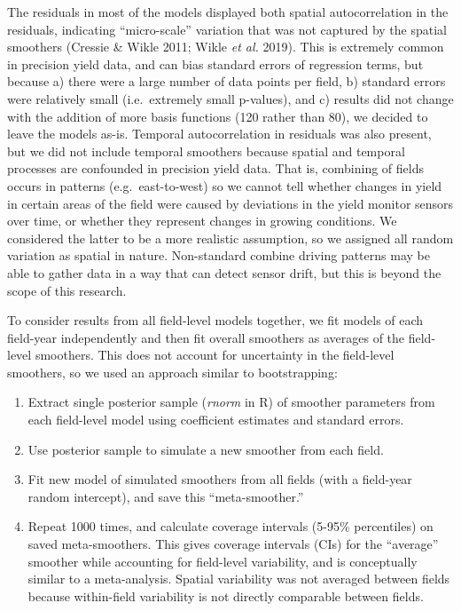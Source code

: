 \documentclass[]{elsarticle} %
\providecommand{\tightlist}{%
  \setlength{\itemsep}{0pt}\setlength{\parskip}{0pt}}
\begin{document}
The residuals in most of the models displayed both spatial autocorrelation in the residuals, indicating ``micro-scale'' variation that was not captured by the spatial smoothers (Cressie \& Wikle 2011; Wikle \emph{et al.} 2019).
This is extremely common in precision yield data, and can bias standard errors of regression terms, but because a) there were a large number of data points per field, b) standard errors were relatively small (i.e.~extremely small p-values), and c) results did not change with the addition of more basis functions (120 rather than 80), we decided to leave the models as-is.
Temporal autocorrelation in residuals was also present, but we did not include temporal smoothers because spatial and temporal processes are confounded in precision yield data.
That is, combining of fields occurs in patterns (e.g.~east-to-west) so we cannot tell whether changes in yield in certain areas of the field were caused by deviations in the yield monitor sensors over time, or whether they represent changes in growing conditions.
We considered the latter to be a more realistic assumption, so we assigned all random variation as spatial in nature.
Non-standard combine driving patterns may be able to gather data in a way that can detect sensor drift, but this is beyond the scope of this research.

To consider results from all field-level models together, we fit models of each field-year independently and then fit overall smoothers as averages of the field-level smoothers.
This does not account for uncertainty in the field-level smoothers, so we used an approach similar to bootstrapping:

\begin{enumerate}
\def\labelenumi{\arabic{enumi}.}
\tightlist
\item
  Extract single posterior sample (\emph{rnorm} in R) of smoother parameters from each field-level model using coefficient estimates and standard errors.
\item
  Use posterior sample to simulate a new smoother from each field.
\item
  Fit new model of simulated smoothers from all fields (with a field-year random intercept), and save this ``meta-smoother.''
\item
  Repeat 1000 times, and calculate coverage intervals (5-95\% percentiles) on saved meta-smoothers.
  This gives coverage intervals (CIs) for the ``average'' smoother while accounting for field-level variability, and is conceptually similar to a meta-analysis.
  Spatial variability was not averaged between fields because within-field variability is not directly comparable between fields.
\end{enumerate}
\end{document}

